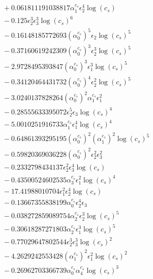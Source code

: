 \documentclass[10pt]{article}
\begin{document}
\begin{align*}
&{}  + 0.061811191038817 \alpha_{1}^{c_s} \epsilon_{2}^{4} \log{\left(c_{s} \right)} \\
&{}  - 0.125 \epsilon_{2}^{3} \epsilon_{3}^{3} \log{\left(c_{s} \right)}^{6} \\
&{}  - 0.16148185772693 \left(\alpha_{0}^{c_s}\right)^{5} \epsilon_{2} \log{\left(c_{s} \right)}^{5} \\
&{}  - 0.37160619242309 \left(\alpha_{0}^{c_s}\right)^{3} \epsilon_{2}^{3} \log{\left(c_{s} \right)}^{5} \\
&{}  - 2.9728495393847 \left(\alpha_{0}^{c_s}\right)^{3} \epsilon_{1}^{3} \log{\left(c_{s} \right)}^{5} \\
&{}  - 0.34120464431732 \left(\alpha_{0}^{c_s}\right)^{4} \epsilon_{2}^{2} \log{\left(c_{s} \right)}^{5} \\
&{}  - 3.0240137828264 \left(\alpha_{0}^{c_s}\right)^{2} \alpha_{1}^{c_s} \epsilon_{1}^{2} \\
&{}  - 0.28555633395072 \epsilon_{2}^{5} \epsilon_{3} \log{\left(c_{s} \right)}^{4} \\
&{}  - 5.0010251916733 \alpha_{1}^{c_s} \epsilon_{1}^{4} \log{\left(c_{s} \right)}^{4} \\
&{}  - 0.64861393295195 \left(\alpha_{0}^{c_s}\right)^{2} \left(\alpha_{1}^{c_s}\right)^{2} \log{\left(c_{s} \right)}^{5} \\
&{}  - 0.59820369036228 \left(\alpha_{0}^{c_s}\right)^{2} \epsilon_{2}^{2} \epsilon_{3}^{2} \\
&{}  - 0.2332798434137 \epsilon_{2}^{2} \epsilon_{3}^{4} \log{\left(c_{s} \right)} \\
&{}  - 0.43500524602535 \alpha_{3}^{c_s} \epsilon_{1}^{2} \log{\left(c_{s} \right)}^{4} \\
&{}  - 17.41988010704 \epsilon_{1}^{2} \epsilon_{2}^{4} \log{\left(c_{s} \right)} \\
&{}  - 0.13667355838199 \alpha_{0}^{c_s} \epsilon_{2}^{4} \epsilon_{3} \\
&{}  - 0.038272859089754 \alpha_{2}^{c_s} \epsilon_{2}^{3} \log{\left(c_{s} \right)}^{5} \\
&{}  - 0.30618287271803 \alpha_{2}^{c_s} \epsilon_{1}^{3} \log{\left(c_{s} \right)}^{5} \\
&{}  - 0.77029647802544 \epsilon_{2}^{3} \epsilon_{3}^{3} \log{\left(c_{s} \right)}^{2} \\
&{}  - 4.2629242553428 \left(\alpha_{1}^{c_s}\right)^{2} \epsilon_{1}^{2} \log{\left(c_{s} \right)}^{2} \\
&{}  - 0.26962703366739 \alpha_{0}^{c_s} \alpha_{4}^{c_s} \log{\left(c_{s} \right)}^{3} \\

\end{align*}
\end{document}
